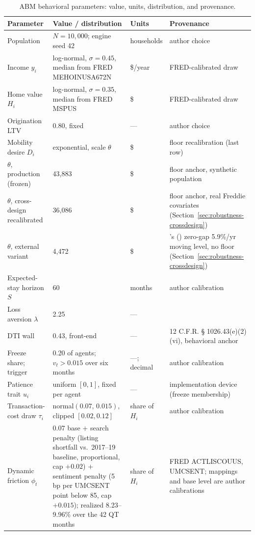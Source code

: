 \documentclass[12pt]{article}
\newcommand{\citepos}[1]{\citeauthor{#1}'s (\citeyear{#1})}
\begin{document}
\begin{table}[H]
\centering
\footnotesize
\begin{threeparttable}
\caption{ABM behavioral parameters: value, units, distribution, and provenance.}
\label{tab:abmparams}
\begin{tabular}{@{}p{3.3cm}p{5.9cm}p{1.6cm}p{4.0cm}@{}}
\toprule
Parameter & Value / distribution & Units & Provenance \\
\midrule
Population & $N = 10{,}000$; engine seed 42 & households & author choice \\
Income $y_i$ & log-normal, $\sigma = 0.45$, median from FRED MEHOINUSA672N & \$/year & FRED-calibrated draw \\
Home value $H_i$ & log-normal, $\sigma = 0.35$, median from FRED MSPUS & \$ & FRED-calibrated draw \\
Origination LTV & 0.80, fixed & --- & author choice \\
Mobility desire $D_i$ & exponential, scale $\theta$ & \$ & floor recalibration (last row) \\
\quad $\theta$, production (frozen) & 43{,}883 & \$ & floor anchor, synthetic population \\
\quad $\theta$, cross-design recalibrated & 36{,}086 & \$ & floor anchor, real Freddie covariates (Section~\ref{sec:robustness-crossdesign}) \\
\quad $\theta$, external variant & 4{,}472 & \$ & \citepos{liebersohn2024} zero-gap 5.9\%/yr moving level, no floor (Section~\ref{sec:robustness-crossdesign}) \\
Expected-stay horizon $S$ & 60 & months & author calibration \\
Loss aversion $\lambda$ & 2.25 & --- & \citet{tversky1992} \\
DTI wall & 0.43, front-end & --- & 12 C.F.R. \S{} 1026.43(e)(2)(vi), behavioral anchor \\
Freeze share; trigger & 0.20 of agents; $v_t > 0.015$ over six months & ---; decimal & author calibration \\
Patience trait $u_i$ & uniform $[0,1]$, fixed per agent & --- & implementation device (freeze membership) \\
Transaction-cost draw $\tau_i$ & normal$(0.07,\,0.015)$, clipped $[0.02, 0.12]$ & share of $H_i$ & author calibration \\
Dynamic friction $\phi_t$ & $0.07$ base $+$ search penalty (listing shortfall vs.\ 2017--19 baseline, proportional, cap $+0.02$) $+$ sentiment penalty (5 bp per UMCSENT point below 85, cap $+0.015$); realized 8.23--9.96\% over the 42 QT months & share of $H_i$ & FRED ACTLISCOUUS, UMCSENT; mappings and base level are author calibrations \\

\end{tabular}
\end{threeparttable}
\end{table}
\end{document}
